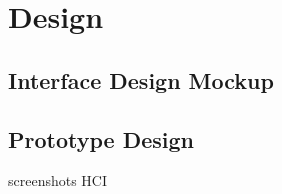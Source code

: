 \section{Design}

\subsection{Interface Design Mockup}

\subsection{Prototype Design}

screenshots
HCI 


